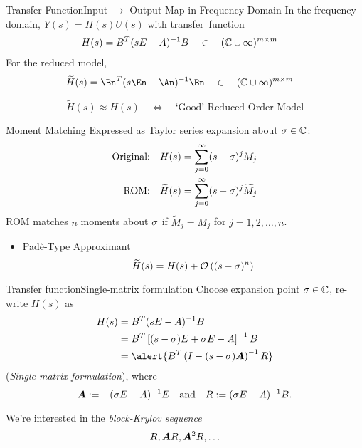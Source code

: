 \documentclass[serif]{beamer}
\begin{document}
\begin{frame}{Transfer Function}{Input $\rightarrow$ Output Map in Frequency Domain}
    In the frequency domain, $Y(s) = H(s)U(s)$ with transfer~function 
 	\begin{align*}
 		H(s) &=  B^T(sE-A)^{-1}B \quad\in\quad (\mathbb{C}\cup\infty)^{m \times m}
 	\end{align*}
 	For the reduced model,
 	\begin{align*}
	 	\widetilde{H}(s) &=  \Bn^T(s\En-\An)^{-1}\Bn \quad\in\quad (\C\cup\infty)^{\nin \times \nin}
 	\end{align*}
 	
 	\[
 		\widetilde{H}(s)\approx H(s) \quad\Longleftrightarrow\quad
 		\text{`Good' Reduced Order Model}
  	\]
\end{frame}
 


\begin{frame}{Moment Matching}
 	Expressed as Taylor series expansion about $\sigma\in\mathbb{C}$:
 	\begin{align*}
 		\text{Original:}\quad H(s) &= \sum_{j=0}^\infty (s-\sigma )^jM_j \\
 		\text{ROM:}\quad\widetilde{H}(s) &= \sum_{j=0}^\infty (s-\sigma )^j\widetilde{M}_j\\
 	\end{align*}
 ROM matches $n$ moments about $\sigma$ if
 $\widetilde{M}_j=M_j$ for $j=1,2,\ldots,n$.
\begin{itemize}
	\item Pad\`e-Type Approximant 
	\[ \widetilde{H}(s) =  H(s) + \mathcal{O}\left( (s-\sigma )^{n} \right) \] 
\end{itemize}
\end{frame}






\begin{frame}{Transfer function}{Single-matrix formulation}
Choose expansion point $\sigma\in\mathbb{C}$, re-write $H(s)$ as  
	\begin{align*}
			H(s) &= B^T(sE-A)^{-1}B\\
			    &= B^T\left[(s-\xp)E +\xp E- A\right]^{-1}B\\
				&= \alert{B^T\left(I-(s-\xp)\A\right)^{-1}R} 
	\end{align*}
(\alert{\emph{Single matrix formulation}}), where 
\[ \bm{A} := -(\sigma E-A)^{-1}E\quad\text{and}\quad R := (\sigma E-A)^{-1}B. \]

We're interested in the \emph{block-Krylov sequence}
\[
	R,\bm{A} R,\bm{A}^2R,\ldots
\]
\end{frame}
\end{document}
